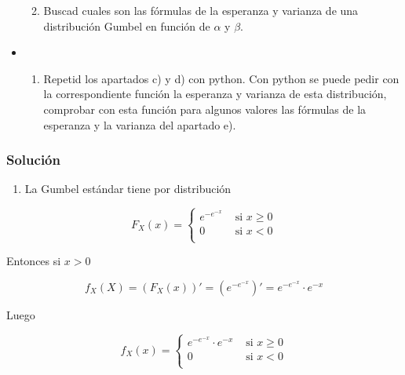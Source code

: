 \documentclass[
]{article}
\providecommand{\tightlist}{%
  \setlength{\itemsep}{0pt}\setlength{\parskip}{0pt}}
\begin{document}
\begin{itemize}
  \begin{enumerate}
  \def\labelenumi{\alph{enumi})}
  \setcounter{enumi}{4}
  \tightlist
  \item
    Buscad cuales son las fórmulas de la esperanza y varianza de una
    distribución Gumbel en función de \(\alpha\) y \(\beta\).
  \end{enumerate}
\item
  \begin{enumerate}
  \def\labelenumi{\alph{enumi})}
  \setcounter{enumi}{5}
  \tightlist
  \item
    Repetid los apartados c) y d) con python. Con python se puede pedir
    con la correspondiente función la esperanza y varianza de esta
    distribución, comprobar con esta función para algunos valores las
    fórmulas de la esperanza y la varianza del apartado e).
  \end{enumerate}
\end{itemize}

\hypertarget{soluciuxf3n-2}{%
\subsubsection{Solución}\label{soluciuxf3n-2}}

\begin{enumerate}
\def\labelenumi{\alph{enumi})}
\tightlist
\item
  La Gumbel estándar tiene por distribución
\end{enumerate}

\[
F_X(x)=\left\{
\begin{array}{ll}
  e^{-e^{-x}} & \mbox{ si } x\geq 0\\
 0 & \mbox{ si } x< 0\\
\end{array}
\right.
\]

Entonces si \(x>0\)

\[f_X(X)=(F_X(x))'=\left(e^{-e^{-x}}\right)'=e^{-e^{-x}}\cdot e^{-x} \]

Luego

\[f_X(x)=\left\{
\begin{array}{ll}
  e^{-e^{-x}}\cdot e^{-x} & \mbox{ si } x\geq 0\\
 0 & \mbox{ si } x< 0\\
\end{array}
\right.
\]
\end{document}
